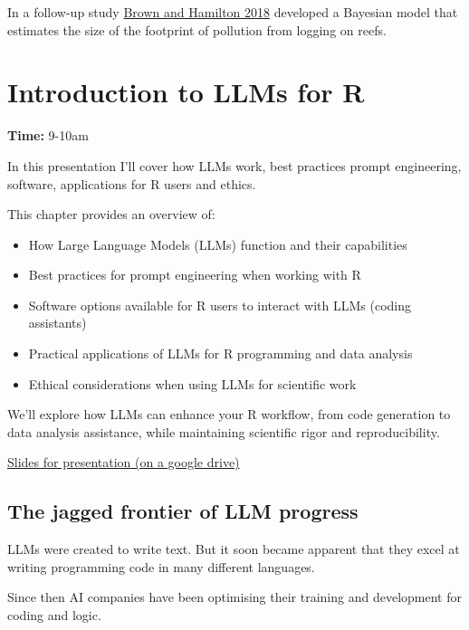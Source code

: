 \documentclass[
  letterpaper,
  DIV=11,
  numbers=noendperiod]{scrreprt}
\providecommand{\tightlist}{%
  \setlength{\itemsep}{0pt}\setlength{\parskip}{0pt}}\usepackage{longtable,booktabs,array}
\begin{document}
In a follow-up study \href{http://dx.doi.org/10.1111/cobi.13079}{Brown
and Hamilton 2018} developed a Bayesian model that estimates the size of
the footprint of pollution from logging on reefs.


\chapter{Introduction to LLMs for R}\label{introduction-to-llms-for-r}

\textbf{Time:} 9-10am

In this presentation I'll cover how LLMs work, best practices prompt
engineering, software, applications for R users and ethics.

This chapter provides an overview of:

\begin{itemize}
\tightlist
\item
  How Large Language Models (LLMs) function and their capabilities
\item
  Best practices for prompt engineering when working with R
\item
  Software options available for R users to interact with LLMs (coding
  assistants)
\item
  Practical applications of LLMs for R programming and data analysis
\item
  Ethical considerations when using LLMs for scientific work
\end{itemize}

We'll explore how LLMs can enhance your R workflow, from code generation
to data analysis assistance, while maintaining scientific rigor and
reproducibility.

\href{https://docs.google.com/presentation/d/1BYfAjU4NPaIQ9CNSRlIVZJpJGof3moS9/edit?usp=drive_link&ouid=107596646496267980935&rtpof=true&sd=true}{Slides
for presentation (on a google drive)}

\section{The jagged frontier of LLM
progress}\label{the-jagged-frontier-of-llm-progress}

LLMs were created to write text. But it soon became apparent that they
excel at writing programming code in many different languages.

Since then AI companies have been optimising their training and
development for coding and logic.
\end{document}
